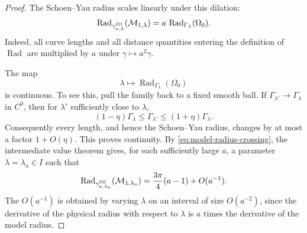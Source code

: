 \documentclass{amsart}
\begin{document}
{\begin{proof}
\noindent The Schoen--Yau radius scales linearly under this dilation:
\begin{equation}
\label{eq:radius-scaling}
        \operatorname{Rad}_{\gamma^{\rm fill}_{a,\lambda}}
        (\mathcal M_{1,\lambda})
        =
        a\,
        \operatorname{Rad}_{\Gamma_\lambda}(\Omega_0).
\end{equation}
Indeed, all curve lengths and all distance quantities entering the
definition of \(\operatorname{Rad}\) are multiplied by \(a\) under
\(\gamma\mapsto a^2\gamma\).

\noindent The map
\[
        \lambda\longmapsto
        \operatorname{Rad}_{\Gamma_\lambda}(\Omega_0)
\]
is continuous. To see this, pull the family back to a fixed smooth ball.
If \(\Gamma_{\lambda'}\to\Gamma_\lambda\) in \(C^0\), then for
\(\lambda'\) sufficiently close to \(\lambda\),
\[
        (1-\eta)\Gamma_\lambda
        \le
        \Gamma_{\lambda'}
        \le
        (1+\eta)\Gamma_\lambda .
\]
Consequently every length, and hence the Schoen--Yau radius, changes by
at most a factor \(1+O(\eta)\). This proves continuity. By
\eqref{eq:model-radius-crossing}, the intermediate value theorem gives,
for each sufficiently large \(a\), a parameter
\(\lambda=\lambda_a\in I\) such that
\begin{equation}
\label{eq:fill-in-radius-calibration}
        \operatorname{Rad}_{\gamma^{\rm fill}_{a,\lambda_a}}
        (\mathcal M_{1,\lambda_a})
        =
        \frac{3\pi}{4}(a-1)
        +
        O(a^{-1}).
\end{equation}
The \(O(a^{-1})\) is obtained by varying \(\lambda\) on an
interval of size \(O(a^{-2})\), since the derivative of the physical
radius with respect to \(\lambda\) is \(a\) times the derivative of the
model radius.


\end{proof}}
\end{document}
